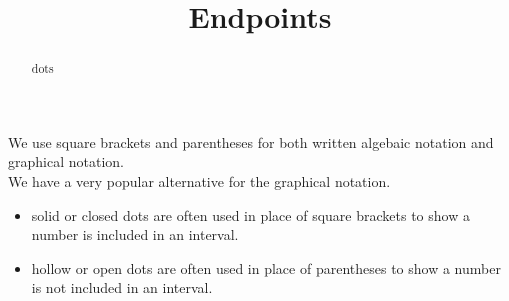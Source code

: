 \documentclass{ximera}
\title{Endpoints}
\begin{document}
\begin{abstract}
dots
\end{abstract}
\maketitle



We use square brackets and parentheses for both written algebaic notation and graphical notation.  \\


We have a very popular alternative for the graphical notation. \\


\begin{itemize}
    \item solid or closed dots are often used in place of square brackets to show a number is included in an interval.
    \item hollow or open dots are often used in place of parentheses to show a number is not included in an interval.
\end{itemize}
\end{document}
